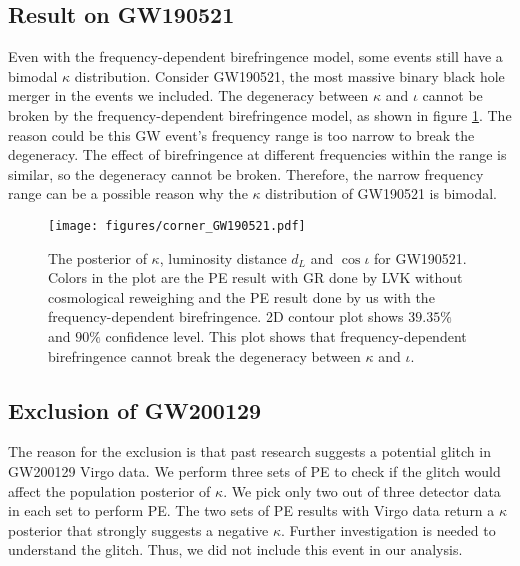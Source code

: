 \documentclass[aps,prd,twocolumn,superscriptaddress,preprintnumbers,floatfix,nofootinbib]{revtex4-2}
\begin{document}
\subsection{Result on GW190521}
Even with the frequency-dependent birefringence model, some events still have a bimodal $\kappa$ distribution.
Consider GW190521, the most massive binary black hole merger in the events we included.
The degeneracy between $\kappa$ and $\iota$ cannot be broken by the frequency-dependent birefringence model, as shown in figure \ref{fig:corner_GW190521}.
The reason could be this GW event's frequency range is too narrow to break the degeneracy.
The effect of birefringence at different frequencies within the range is similar, so the degeneracy cannot be broken.
Therefore, the narrow frequency range can be a possible reason why the $\kappa$ distribution of GW190521 is bimodal.

\begin{figure}[h]
    \texttt{[image: figures/corner\_GW190521.pdf]}
    \caption{
        The posterior of $\kappa$, luminosity distance $d_L$ and $\cos{\iota}$ for GW190521.
        Colors in the plot are the PE result with GR done by LVK without cosmological reweighing \citep{GWTC-2.1, GWTC-3} and the PE result done by us with the frequency-dependent birefringence.
        2D contour plot shows $39.35\%$ and $90\%$ confidence level.
        This plot shows that frequency-dependent birefringence cannot break the degeneracy between $\kappa$ and $\iota$.
    }
    \label{fig:corner_GW190521}
\end{figure}

\subsection{Exclusion of GW200129}
\label{sec:GW200129}
The reason for the exclusion is that past research suggests a potential glitch in GW200129 Virgo data. \citep{GW200129_glitch}
We perform three sets of PE to check if the glitch would affect the population posterior of $\kappa$.
We pick only two out of three detector data in each set to perform PE.
The two sets of PE results with Virgo data return a $\kappa$ posterior that strongly suggests a negative $\kappa$.
Further investigation is needed to understand the glitch.
Thus, we did not include this event in our analysis.
\end{document}

